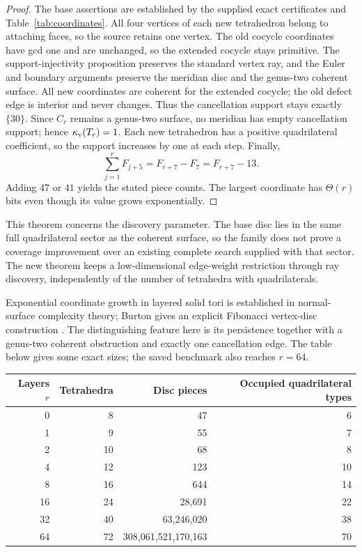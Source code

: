 \begin{proof}
The base assertions are established by the supplied exact certificates
and Table~\ref{tab:coordinates}. All four vertices of each new tetrahedron
belong to attaching faces, so the source retains one vertex. The old
cocycle coordinates have gcd one and are unchanged, so the extended
cocycle stays primitive.
The support-injectivity proposition preserves the standard vertex ray,
and the Euler and boundary arguments preserve the meridian disc and the
genus-two coherent surface.  All new coordinates are coherent for the
extended cocycle; the old defect edge is interior and never changes.
Thus the cancellation support stays exactly $\{30\}$. Since $C_r$ remains a genus-two surface, no meridian has empty cancellation support; hence $\kappa_{\mathrm{v}}(T_r)=1$. Each new
tetrahedron has a positive quadrilateral coefficient, so the support
increases by one at each step.  Finally,
\[
 \sum_{j=1}^r F_{j+5}=F_{r+7}-F_7=F_{r+7}-13.
\]
Adding $47$ or $41$ yields the stated piece counts.  The largest
coordinate has $\Theta(r)$ bits even though its value grows exponentially.
\end{proof}

This theorem concerns the discovery parameter.  The base disc lies in
the same full quadrilateral sector as the coherent surface, so the
family does not prove a coverage improvement over an existing complete
search supplied with that sector.  The new theorem keeps a low-dimensional
edge-weight restriction through ray discovery, independently of the
number of tetrahedra with quadrilaterals.


Exponential coordinate growth in layered solid tori is established in
normal-surface complexity theory; Burton gives an explicit Fibonacci
vertex-disc construction \cite{burton-complexity}. The distinguishing
feature here is its persistence together with a genus-two coherent
obstruction and exactly one cancellation edge. The table below gives
some exact sizes; the saved benchmark also reaches $r=64$.
\begin{center}
\begin{tabular}{@{}r r r r@{}}
\toprule
Layers $r$ & Tetrahedra & Disc pieces & Occupied quadrilateral types\\
\midrule
0 & 8 & 47 & 6\\
1 & 9 & 55 & 7\\
2 & 10 & 68 & 8\\
4 & 12 & 123 & 10\\
8 & 16 & 644 & 14\\
16 & 24 & 28,691 & 22\\
32 & 40 & 63,246,020 & 38\\
64 & 72 & 308,061,521,170,163 & 70\\
\bottomrule
\end{tabular}
\end{center}

